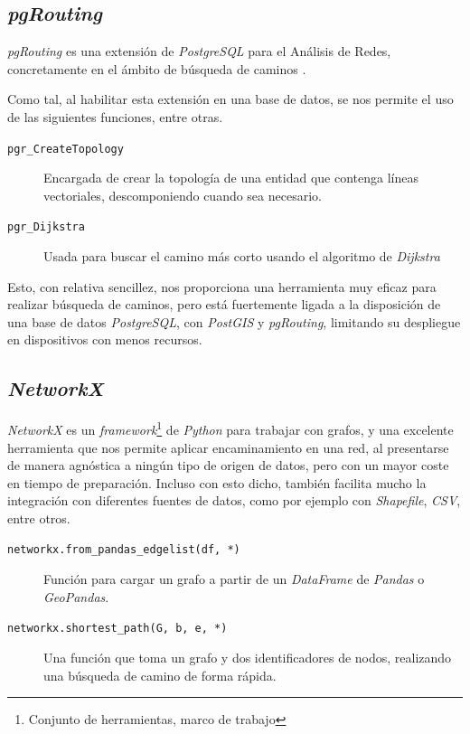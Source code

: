 \subsection{\textit{pgRouting}}
\textit{pgRouting} es una extensión de \textit{PostgreSQL} para el Análisis de Redes, concretamente en el ámbito de búsqueda de caminos \autocite[410-416]{obehsu}.

Como tal, al habilitar esta extensión en una base de datos, se nos permite el uso de las siguientes funciones, entre otras.

\begin{description}
	\item[\texttt{pgr\_CreateTopology}] Encargada de crear la topología de una entidad que contenga líneas vectoriales, descomponiendo cuando sea necesario.
	\item[\texttt{pgr\_Dijkstra}] Usada para buscar el camino más corto usando el algoritmo de \textit{Dijkstra}
\end{description}

Esto, con relativa sencillez, nos proporciona una herramienta muy eficaz para realizar búsqueda de caminos, pero está fuertemente ligada a la disposición de una base de datos \textit{PostgreSQL}, con \textit{PostGIS} y \textit{pgRouting}, limitando su despliegue en dispositivos con menos recursos.

\subsection{\textit{NetworkX}}
\textit{NetworkX} es un \textit{framework}\footnote{Conjunto de herramientas, marco de trabajo} de \textit{Python} para trabajar con grafos, y una excelente herramienta que nos permite aplicar encaminamiento en una red, al presentarse de manera agnóstica a ningún tipo de origen de datos, pero con un mayor coste en tiempo de preparación.
Incluso con esto dicho, también facilita mucho la integración con diferentes fuentes de datos, como por ejemplo con \textit{Shapefile}, \textit{CSV}, entre otros.

\begin{description}
	\item[\texttt{networkx.from\_pandas\_edgelist(df, *)}] Función para cargar un grafo a partir de un \textit{DataFrame} de  \textit{Pandas} o \textit{GeoPandas}.
	\item[\texttt{networkx.shortest\_path(G, b, e, *)}] Una función que toma un grafo y dos identificadores de nodos, realizando una búsqueda de camino de forma rápida.
\end{description}